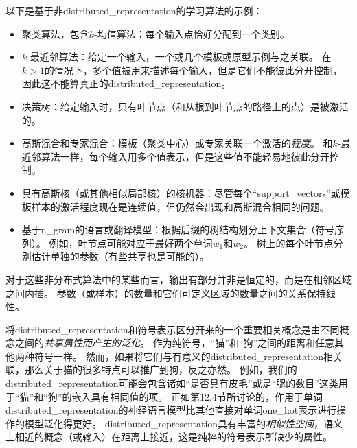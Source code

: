 以下是基于非\gls{distributed_representation}的学习算法的示例：
\begin{itemize}
	\item 聚类算法，包含$k$-均值算法：每个输入点恰好分配到一个类别。

	\item $k$-最近邻算法：给定一个输入，一个或几个模板或原型示例与之关联。
	在$k > 1$的情况下，多个值被用来描述每个输入，但是它们不能彼此分开控制，因此这不能算真正的\gls{distributed_representation}。

	\item 决策树：给定输入时，只有叶节点（和从根到叶节点的路径上的点）是被激活的。

	\item 高斯混合和专家混合：模板（聚类中心）或专家关联一个激活的\emph{程度}。
	和$k$-最近邻算法一样，每个输入用多个值表示，但是这些值不能轻易地彼此分开控制。

	\item 具有高斯核（或其他相似局部核）的核机器：尽管每个``\gls{support_vectors}''或模板样本的激活程度现在是连续值，但仍然会出现和高斯混合相同的问题。

	\item 基于\gls{n_gram}的语言或翻译模型：根据后缀的树结构划分上下文集合（符号序列）。
	例如，叶节点可能对应于最好两个单词$w_1$和$w_2$。
	树上的每个叶节点分别估计单独的参数（有些共享也是可能的）。
\end{itemize}


对于这些非分布式算法中的某些而言，输出有部分并非是恒定的，而是在相邻区域之间内插。
参数（或样本）的数量和它们可定义区域的数量之间的关系保持线性。


将\gls{distributed_representation}和符号表示区分开来的一个重要相关概念是由不同概念之间的\emph{共享属性而产生的泛化}。
作为纯符号，``猫''和``狗''之间的距离和任意其他两种符号一样。
然而，如果将它们与有意义的\gls{distributed_representation}相关联，那么关于猫的很多特点可以推广到狗，反之亦然。
例如，我们的\gls{distributed_representation}可能会包含诸如``是否具有皮毛''或是``腿的数目''这类用于``猫''和``狗''的嵌入具有相同值的项。
正如第12.4节所讨论的，作用于单词\gls{distributed_representation}的神经语言模型比其他直接对单词\gls{one_hot}表示进行操作的模型泛化得更好。
\gls{distributed_representation}具有丰富的\emph{相似性空间}，语义上相近的概念（或输入）在距离上接近，这是纯粹的符号表示所缺少的属性。



